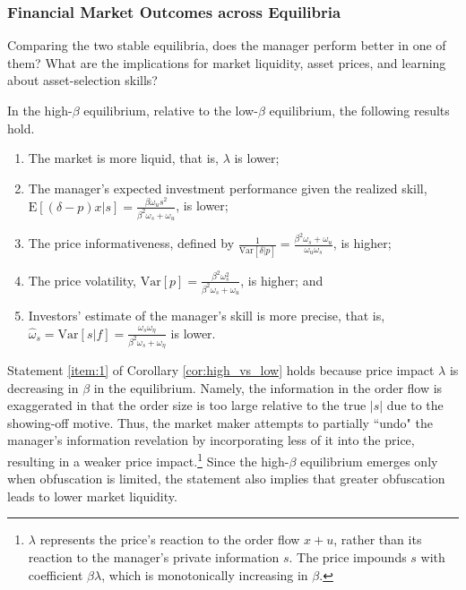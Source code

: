 \subsubsection{Financial Market Outcomes across Equilibria}\label{sss:high_vs_low}
Comparing the two stable equilibria, does the manager perform better in one of them? What are the implications for market liquidity, asset prices, and learning about asset-selection skills?
\begin{corollary}\label{cor:high_vs_low}
In the high-$\beta$ equilibrium, relative to the low-$\beta$ equilibrium, the following results hold.
\begin{enumerate}[label=(\roman*)]
\item \label{item:1} The market is more liquid, that is, $\lambda$ is lower;
\item \label{item:2} The manager's expected investment performance given the realized skill, $\mathrm{E}[(\delta-p)x|s]=\frac{\beta\omega_{u}s^{2}}{\beta^{2} \omega_{s}+\omega_{u}}$, is lower;
\item \label{item:3} The price informativeness, defined by $\frac{1}{\mathrm{Var}[\delta|p]}=\frac{\beta^{2} \omega_{s}+\omega_{u}}{\omega_{u} \omega_{s}}$, is higher;
\item \label{item:4} The price volatility, $\mathrm{Var}[p]=\frac{\beta^{2}\omega_{s}^{2}}{\beta^{2} \omega_{s}+\omega_{u}}$, is higher; and
\item \label{item:5} Investors' estimate of the manager's skill is more precise, that is, $\hat{\omega}_{s}=\mathrm{Var}[s|f] = \frac{\omega_{s}\omega_{\eta}}{\beta^{2}\omega_{s}+\omega_{\eta}}$ is lower.
\end{enumerate}
\end{corollary}

Statement \ref{item:1} of Corollary \ref{cor:high_vs_low} holds because price impact $\lambda$ is decreasing in $\beta$ in the equilibrium. Namely, the information in the order flow is exaggerated in that the order size is too large relative to the true $|s|$ due to the showing-off motive. Thus, the market maker attempts to partially ``undo" the manager's information revelation by incorporating less of it into the price, resulting in a weaker price impact.\footnote{$\lambda$ represents the price's reaction to the order flow $x+u$, rather than its reaction to the manager's private information $s$. The price impounds $s$ with coefficient $\beta\lambda$, which is monotonically increasing in $\beta$.} Since the high-$\beta$ equilibrium emerges only when obfuscation is limited, the statement also implies that greater obfuscation leads to lower market liquidity.

